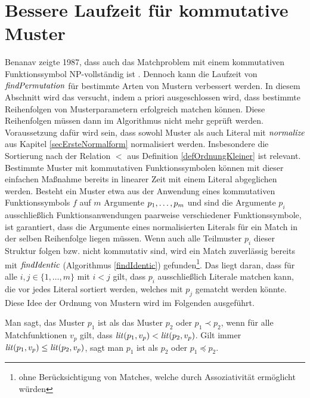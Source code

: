 \section{Bessere Laufzeit für kommutative Muster} \label{subsecCMuster}

Benanav zeigte 1987, dass auch das Matchproblem mit einem kommutativen Funktionssymbol NP-vollständig ist \cite{NPHardMatching}. Dennoch kann die Laufzeit von $\mathit{findPermutation}$ für bestimmte Arten von Mustern verbessert werden. In diesem Abschnitt wird das versucht, indem a priori ausgeschlossen wird, dass bestimmte Reihenfolgen von Musterparametern erfolgreich matchen können. Diese Reihenfolgen müssen dann im Algorithmus nicht mehr geprüft werden.
Voraussetzung dafür wird sein, dass sowohl Muster als auch Literal mit $\mathit{normalize}$ aus Kapitel \ref{secErsteNormalform} normalisiert werden. Insbesondere die Sortierung nach der Relation $<$ aus Definition \ref{defOrdnungKleiner} ist relevant.
Bestimmte Muster mit kommutativen Funktionssymbolen können mit dieser einfachen Maßnahme bereits in linearer Zeit mit einem Literal abgeglichen werden. Besteht ein Muster etwa aus der Anwendung eines kommutativen Funktionssymbols $f$ auf $m$ Argumente ${p}_{1}, \dots, {p}_{m}$ und sind die Argumente $p_i$ ausschließlich Funktionsanwendungen paarweise verschiedener Funktionssymbole, ist garantiert, dass die Argumente eines normalisierten Literals für ein Match in der selben Reihenfolge liegen müssen. Wenn auch alle Teilmuster $p_i$ dieser Struktur folgen bzw. nicht kommutativ sind, wird ein Match zuverlässig bereits mit $\mathit{findIdentic}$ (Algorithmus \ref{findIdentic}) gefunden\footnote{ohne Berücksichtigung von Matches, welche durch Assoziativität ermöglicht würden}. Das liegt daran, dass für alle $i, j \in \{1, \dots, m\}$ mit $ i < j$ gilt, dass $p_i$ ausschließlich Literale matchen kann, die vor jedes Literal sortiert werden, welches mit $p_j$ gematcht werden könnte. Diese Idee der Ordnung von Mustern wird im Folgenden ausgeführt.


\begin{definition}
Man sagt, das Muster $p_1$ ist  als das Muster $p_2$ oder $p_1 \prec p_2$, wenn für alle Matchfunktionen $v_p$ gilt, dass $\mathit{lit}(p_1, v_p) < \mathit{lit}(p_2, v_p)$. Gilt immer $\mathit{lit}(p_1, v_p) \leq \mathit{lit}(p_2, v_p)$, sagt man $p_1$ ist  als $p_2$ oder $p_1 \preceq p_2$.
\end{definition}


